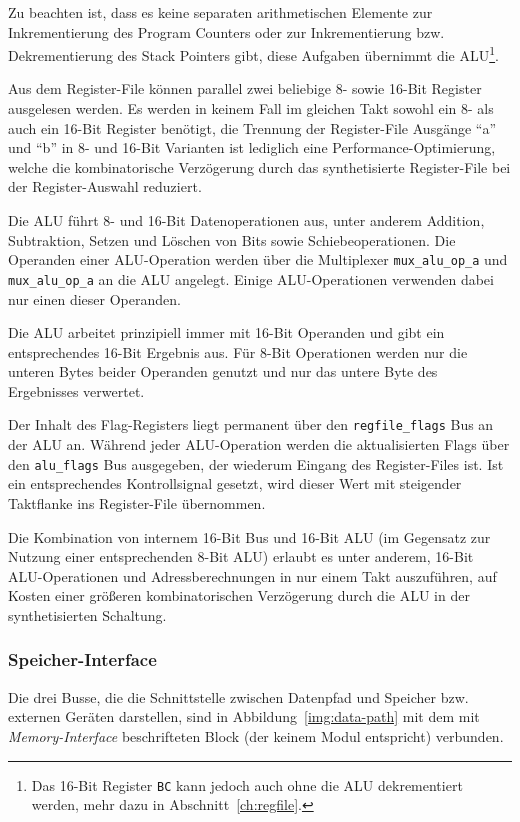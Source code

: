 \documentclass[ngerman, cd=lightcolor]{tudscrreprt}
\begin{document}
Zu beachten ist, dass es keine separaten arithmetischen Elemente zur
Inkrementierung des Program Counters oder zur Inkrementierung bzw.
Dekrementierung des Stack Pointers gibt, diese Aufgaben übernimmt die
ALU\footnote{Das 16-Bit Register \texttt{BC} kann jedoch auch ohne die ALU
dekrementiert werden, mehr dazu in Abschnitt~\ref{ch:regfile}.}.

Aus dem Register-File können parallel zwei beliebige 8- sowie 16-Bit Register
ausgelesen werden. Es werden in keinem Fall im gleichen Takt sowohl ein 8- als
auch ein 16-Bit Register benötigt, die Trennung der Register-File Ausgänge
``a'' und ``b'' in 8- und 16-Bit Varianten ist lediglich eine
Performance-Optimierung, welche die kombinatorische Verzögerung durch das
synthetisierte Register-File bei der Register-Auswahl reduziert.

Die ALU führt 8- und 16-Bit Datenoperationen aus, unter anderem Addition,
Subtraktion, Setzen und Löschen von Bits sowie Schiebeoperationen.
Die Operanden einer ALU-Operation werden über die Multiplexer
\texttt{mux\_alu\_op\_a} und \texttt{mux\_alu\_op\_a} an die ALU angelegt.
Einige ALU-Operationen verwenden dabei nur einen dieser Operanden.

Die ALU arbeitet prinzipiell immer mit 16-Bit Operanden und gibt ein
entsprechendes 16-Bit Ergebnis aus. Für 8-Bit Operationen werden nur die
unteren Bytes beider Operanden genutzt und nur das untere Byte des Ergebnisses
verwertet.

Der Inhalt des Flag-Registers liegt permanent über den \texttt{regfile\_flags}
Bus an der ALU an. Während jeder ALU-Operation werden die aktualisierten Flags
über den \texttt{alu\_flags} Bus ausgegeben, der wiederum Eingang des
Register-Files ist. Ist ein entsprechendes Kontrollsignal gesetzt, wird dieser
Wert mit steigender Taktflanke ins Register-File übernommen.

Die Kombination von internem 16-Bit Bus und 16-Bit ALU (im Gegensatz zur
Nutzung einer entsprechenden 8-Bit ALU) erlaubt es unter anderem, 16-Bit
ALU-Operationen und Adressberechnungen in nur einem Takt auszuführen, auf
Kosten einer größeren kombinatorischen Verzögerung durch die ALU in der
synthetisierten Schaltung.

\subsubsection{Speicher-Interface}

Die drei Busse, die die Schnittstelle zwischen Datenpfad und Speicher bzw.
externen Geräten darstellen, sind in Abbildung~\ref{img:data-path} mit dem mit
\textit{Memory-Interface} beschrifteten Block (der keinem Modul entspricht)
verbunden.
\end{document}
